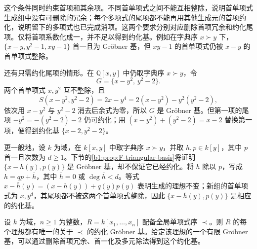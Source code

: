 这个条件同时约束首项和其余项。不同首单项式之间不能互相整除，说明首单项式生成组中没有可删除的冗余；每个多项式的尾项都不能再用其他生成元的首项约化，说明留下的多项式也已完成消项。这两个要求分别对应删除首项冗余和约化尾项。仅将首项系数化成一，并不足以得到约化基。例如在字典序 \(x\succ y\) 下，\(\{x-y,y^2-1,xy-1\}\) 首一且为 Gröbner 基，但 \(xy-1\) 的首单项式仍被 \(x-y\) 的首单项式整除。

还有只需约化尾项的情形。在 \(\mathbb Q[x,y]\) 中仍取字典序 \(x\succ y\)，令
\[
	G=\{x-y^2,\,y^2-2\}.
\]
两个首单项式 \(x,y^2\) 互不整除，且
\[
	S(x-y^2,y^2-2)=2x-y^4=2(x-y^2)-y^2(y^2-2),
\]
依次用 \(x-y^2\) 与 \(y^2-2\) 消去后余式为零，所以 \(G\) 是 Gröbner 基。但第一项的尾项 \(-y^2=-(y^2-2)-2\) 仍可约化；用 \((x-y^2)+(y^2-2)=x-2\) 替换第一项，便得到约化基 \(\{x-2,y^2-2\}\)。

\ProseParagraphBreak
更一般地，设 \(k\) 为域，在 \(k[x,y]\) 中取字典序 \(x\succ y\)，并取 \(h,p\in k[y]\)，其中 \(p\) 首一且次数为 \(d\ge1\)。下节的\cref{b1:prop:F-triangular-basis}将证明 \(\{x-h(y),p(y)\}\) 是 Gröbner 基，却不保证它已经约化。将 \(h\) 除以 \(p\)，写成 \(h=qp+\bar h\)，其中 \(\bar h=0\) 或 \(\deg\bar h<d\)。等式 \(x-\bar h(y)=(x-h(y))+q(y)p(y)\) 表明生成的理想不变；新组的首单项式为 \(x,y^d\)，其尾项都不被这两个首单项式整除，因此 \(\{x-\bar h(y),p(y)\}\) 是相应的约化基。

\begin{theorem}\label{b1:thm:F-reduced-groebner}
	设 \(k\) 为域，\(n\geq1\) 为整数，\(R=k[x_1,\ldots,x_n]\) 配备全局单项式序 \(\prec\)。则 \(R\) 的每个理想都有唯一的关于 \(\prec\) 的约化 Gröbner 基。给定该理想的一个有限 Gröbner 基，可以通过删除首项冗余、首一化及多元除法得到这个约化基。
\end{theorem}

